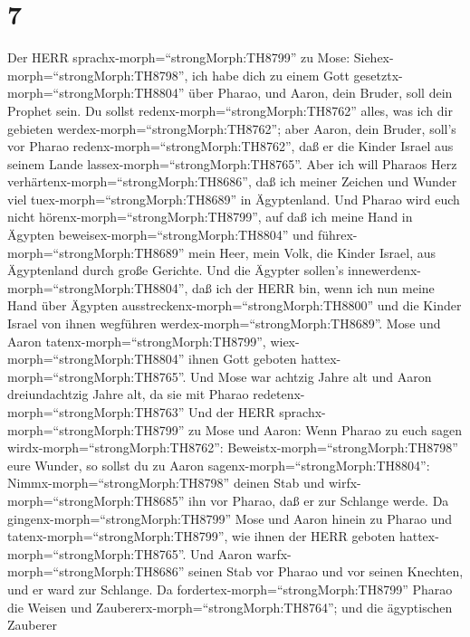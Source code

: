 \hypertarget{section-6}{%
\section{7}\label{section-6}}

 Der HERR sprachx-morph=``strongMorph:TH8799'' zu Mose:
Siehex-morph=``strongMorph:TH8798'', ich habe dich zu einem Gott
gesetztx-morph=``strongMorph:TH8804'' über Pharao, und Aaron, dein
Bruder, soll dein Prophet sein.  Du sollst
redenx-morph=``strongMorph:TH8762'' alles, was ich dir gebieten
werdex-morph=``strongMorph:TH8762''; aber Aaron, dein Bruder, soll's vor
Pharao redenx-morph=``strongMorph:TH8762'', daß er die Kinder Israel aus
seinem Lande lassex-morph=``strongMorph:TH8765''.  Aber ich
will Pharaos Herz verhärtenx-morph=``strongMorph:TH8686'', daß ich
meiner Zeichen und Wunder viel tuex-morph=``strongMorph:TH8689'' in
Ägyptenland.  Und Pharao wird euch nicht
hörenx-morph=``strongMorph:TH8799'', auf daß ich meine Hand in Ägypten
beweisex-morph=``strongMorph:TH8804'' und
führex-morph=``strongMorph:TH8689'' mein Heer, mein Volk, die Kinder
Israel, aus Ägyptenland durch große Gerichte.  Und die
Ägypter sollen's innewerdenx-morph=``strongMorph:TH8804'', daß ich der
HERR bin, wenn ich nun meine Hand über Ägypten
ausstreckenx-morph=``strongMorph:TH8800'' und die Kinder Israel von
ihnen wegführen werdex-morph=``strongMorph:TH8689''.  Mose
und Aaron tatenx-morph=``strongMorph:TH8799'',
wiex-morph=``strongMorph:TH8804'' ihnen Gott geboten
hattex-morph=``strongMorph:TH8765''.  Und Mose war achtzig
Jahre alt und Aaron dreiundachtzig Jahre alt, da sie mit Pharao
redetenx-morph=``strongMorph:TH8763''  Und der HERR
sprachx-morph=``strongMorph:TH8799'' zu Mose und Aaron: 
Wenn Pharao zu euch sagen wirdx-morph=``strongMorph:TH8762'':
Beweistx-morph=``strongMorph:TH8798'' eure Wunder, so sollst du zu Aaron
sagenx-morph=``strongMorph:TH8804'': Nimmx-morph=``strongMorph:TH8798''
deinen Stab und wirfx-morph=``strongMorph:TH8685'' ihn vor Pharao, daß
er zur Schlange werde.  Da
gingenx-morph=``strongMorph:TH8799'' Mose und Aaron hinein zu Pharao und
tatenx-morph=``strongMorph:TH8799'', wie ihnen der HERR geboten
hattex-morph=``strongMorph:TH8765''. Und Aaron
warfx-morph=``strongMorph:TH8686'' seinen Stab vor Pharao und vor seinen
Knechten, und er ward zur Schlange.  Da
fordertex-morph=``strongMorph:TH8799'' Pharao die Weisen und
Zaubererx-morph=``strongMorph:TH8764''; und die ägyptischen Zauberer
